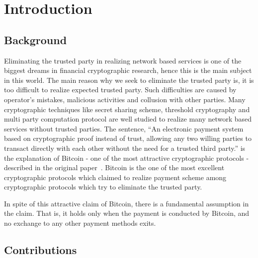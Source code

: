 \section{Introduction}          
\subsection{Background}
Eliminating the trusted party in realizing network based services is one of 
the biggest dreams in financial cryptographic research, hence this is the main subject in this world. 
The main reason why we seek
to eliminate the trusted party is, it is too difficult to realize expected trusted party. Such difficulties are caused by operator's mistakes, malicious activities and 
collusion with other parties. Many cryptographic techniques like secret sharing scheme, threshold cryptography and multi party computation
protocol are well studied to realize many network based services without trusted parties. 
The sentence, ``An electronic payment system based on cryptographic proof instead of trust, allowing any two willing parties to transact directly with each other without the need for a trusted third party.'' is the explanation of Bitcoin - one of the most attractive cryptographic protocols - described in 
the original paper~\cite{N08}. Bitcoin is the one of the most excellent cryptographic protocols which 
claimed to realize payment scheme among cryptographic protocols which try to eliminate the trusted party.

In spite of this attractive claim of Bitcoin, there is a fundamental assumption in the claim. That is, it holds only when the payment is conducted by 
Bitcoin, and no exchange to any other payment methods exits. 




\subsection{Contributions}


